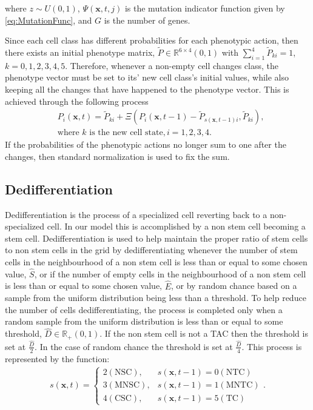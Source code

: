 \documentclass[\main/thesis.tex]{subfiles}
\begin{document}
where $z {\sim} U(0, 1)$, $\Psi(\boldsymbol{x}, t, j)$ is the mutation indicator function given by \eqref{eq:MutationFunc}, and $G$ is the number of genes.

Since each cell class has different probabilities for each phenotypic action, then 
there exists an initial phenotype matrix, $\tilde{P} {\in} \mathbb{R}^{6{\times}4}(0, 1)$ 
with $\sum_{i{=}1}^{4} \tilde{P}_{ki} {=} 1$, $k {=} 0, 1, 2, 3, 4, 5$.
Therefore, whenever a non-empty cell changes class, the phenotype vector 
must be set to its' new cell class's initial values, while also keeping all the 
changes that have happened to the phenotype vector. This is achieved through the following process
\begin{align}
&P_i(\boldsymbol{x}, t) {=} \tilde{P}_{ki} {+} \Xi(P_i(\boldsymbol{x}, t{-}1)
                                                      {-} \tilde{P}_{s(\boldsymbol{x}, t{-}1)i},
                                                          \tilde{P}_{ki}), 
\label{eq:PhenotypeTransferFunc}\\
& \text{where } k \text{ is the new cell state}, i {=} 1, 2, 3, 4.\nonumber 
\end{align}
If the probabilities of the phenotypic actions no longer sum to one after the changes, then standard normalization is used to fix the sum.

\subsection{Dedifferentiation}
Dedifferentiation is the process of a specialized cell reverting back to a non-specialized cell. In our model this is accomplished by a non stem cell becoming a stem cell. Dedifferentiation is used to help maintain the proper ratio of stem cells to non stem cells in the grid by dedifferentiating whenever the number of stem cells in the neighbourhood of a non stem cell is less than or equal to some chosen value, $\hat{S}$, or if the number of empty cells in the neighbourhood of a non stem cell is less than or equal to some chosen value, $\hat{E}$, or by random chance based on a sample from the uniform distribution being less than a threshold. To help reduce the number of cells dedifferentiating, the process is completed only when a random sample from the uniform distribution is less than or equal to some threshold, $\hat{D} {\in} \mathbb{R}_+(0, 1)$. If the non stem cell is not a TAC then the threshold is set at $\frac{\hat{D}}{2}$. In the case of random chance the threshold is set at $\frac{\hat{D}}{4}$. This process is represented by the function:
\begin{align}
s(\boldsymbol{x}, t) {=} \begin{cases}
                 2 (\text{NSC}), & s(\boldsymbol{x}, t{-}1) {=} 0 (\text{NTC})
                 \\
                 3 (\text{MNSC}), & s(\boldsymbol{x}, t{-}1) {=} 1 (\text{MNTC})
                 \\
                 4 (\text{CSC}), & s(\boldsymbol{x}, t{-}1) {=} 5 (\text{TC})
               \end{cases}.
\label{eq:DeDifferentiationFunction}
\end{align}
\end{document}
